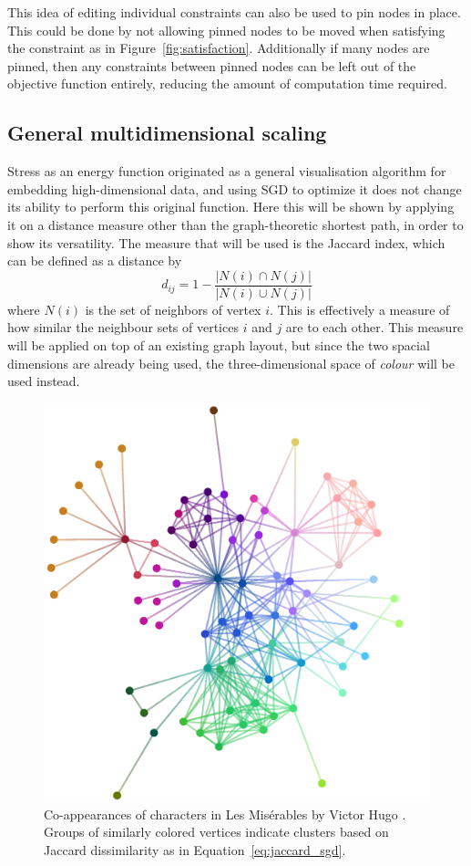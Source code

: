 This idea of editing individual constraints can also be used to pin nodes in place. This could be done by not allowing pinned nodes to be moved when satisfying the constraint as in Figure~\ref{fig:satisfaction}. Additionally if many nodes are pinned, then any constraints between pinned nodes can be left out of the objective function entirely, reducing the amount of computation time required.


\subsection{General multidimensional scaling}
\label{sec:normal_mds}
Stress as an energy function originated as a general visualisation algorithm for embedding high-dimensional data, and using SGD to optimize it does not change its ability to perform this original function. Here this will be shown by applying it on a distance measure other than the graph-theoretic shortest path, in order to show its versatility. The measure that will be used is the Jaccard index, which can be defined as a distance by
\begin{equation}
  d_{ij} = 1 - \frac{|N(i) \cap N(j)|}{|N(i) \cup N(j)|}
  \label{eq:jaccard_sgd}
\end{equation}
where $N(i)$ is the set of neighbors of vertex $i$. This is effectively a measure of how similar the neighbour sets of vertices $i$ and $j$ are to each other.
This measure will be applied on top of an existing graph layout, but since the two spacial dimensions are already being used, the three-dimensional space of \emph{colour} will be used instead.

\begin{figure}
  \centering
  \includegraphics[width=.7\textwidth]{stress/lesmis.png}
  \caption[A graph \texttt{lesmis} with node colours embedded in RGB space]{
  Co-appearances of characters in Les Mis\'erables by Victor Hugo \citep{Knuth1993}.
  Groups of similarly colored vertices indicate clusters based on Jaccard dissimilarity as in Equation~\eqref{eq:jaccard_sgd}.
  }
  \label{fig:jaccard}
\end{figure}

